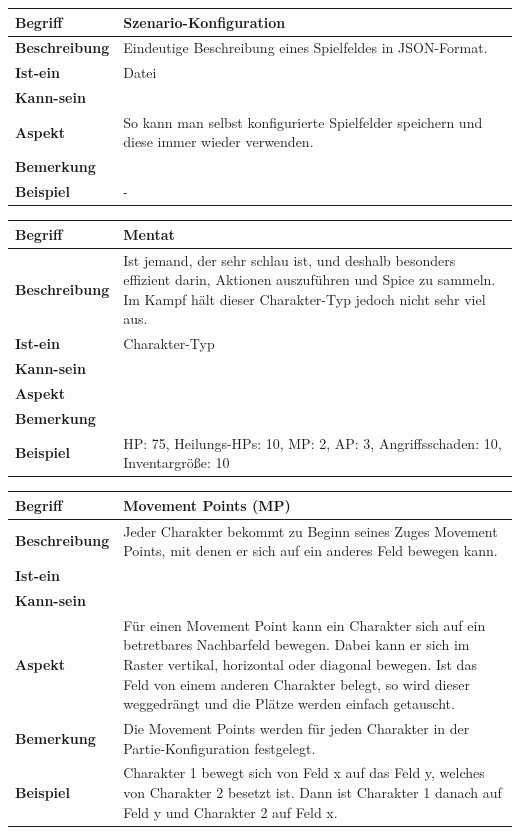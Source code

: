 \documentclass[12pt]{article}
\newcounter{fa}
\newcounter{nfa}
\begin{document}
\begin{tabularx}{\linewidth}{|l|X|}
\hline
\textbf{Begriff} & \textbf{Szenario-Konfiguration } \\
\hline
\textbf{Beschreibung} & Eindeutige Beschreibung eines Spielfeldes in JSON-Format. \\
\hline
\textbf{Ist-ein} & Datei \\
\hline
\textbf{Kann-sein} & \\
\hline
\textbf{Aspekt} & So kann man selbst konfigurierte Spielfelder speichern und diese immer wieder verwenden.\\
\hline
\textbf{Bemerkung} &  \\
\hline
\textbf{Beispiel} & - \\
\hline
\end{tabularx}

\begin{tabularx}{\linewidth}{|l|X|}
\hline
\textbf{Begriff} & \textbf{Mentat} \\
\hline
\textbf{Beschreibung} & Ist jemand, der sehr schlau ist, und deshalb besonders effizient darin, Aktionen auszuführen und Spice zu sammeln. Im Kampf hält dieser Charakter-Typ jedoch nicht sehr viel aus. \\
\hline
\textbf{Ist-ein} & Charakter-Typ\\
\hline
\textbf{Kann-sein} & \\
\hline
\textbf{Aspekt} & \\
\hline
\textbf{Bemerkung} &  \\
\hline
\textbf{Beispiel} & HP: 75, Heilungs-HPs: 10, MP: 2, AP: 3, Angriffsschaden: 10, Inventargröße: 10 \\
\hline
\end{tabularx}

\begin{tabularx}{\linewidth}{|l|X|}
\hline
\textbf{Begriff} & \textbf{Movement Points (MP)} \\
\hline
\textbf{Beschreibung} & Jeder Charakter bekommt zu Beginn seines Zuges Movement Points, mit denen er sich auf ein anderes Feld bewegen kann. \\
\hline
\textbf{Ist-ein} & \\
\hline
\textbf{Kann-sein} & \\
\hline
\textbf{Aspekt} & Für einen Movement Point kann ein Charakter sich auf ein betretbares Nachbarfeld bewegen. Dabei kann er sich im Raster vertikal, horizontal oder diagonal bewegen. Ist das Feld von einem anderen Charakter belegt, so wird dieser weggedrängt und die Plätze werden einfach getauscht.\\
\hline
\textbf{Bemerkung} & Die Movement Points werden für jeden Charakter in der Partie-Konfiguration festgelegt. \\
\hline
\textbf{Beispiel} & Charakter 1 bewegt sich von Feld x auf das Feld y, welches von Charakter 2 besetzt ist. Dann ist Charakter 1 danach auf Feld y und Charakter 2 auf Feld x. \\
\hline
\end{tabularx}
\end{document}
